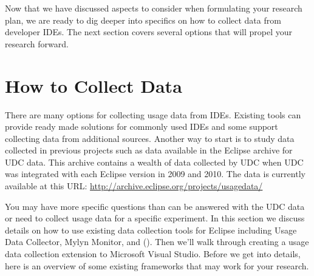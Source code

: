 \vspace{0.1in}
Now that we have discussed aspects to consider when formulating your research plan, we are ready to dig deeper into specifics on how to collect data from developer IDEs.  The next section covers several options that will propel your research forward.

\section{How to Collect Data}
\label{SecHowToCollectData}

There are many options for collecting usage data from IDEs.   Existing tools can provide ready made solutions for commonly used IDEs and some support collecting data from additional sources.   Another way to start is to study data collected in previous projects such as data available in the Eclipse archive for UDC data.  This archive contains a wealth of data collected by UDC when UDC was integrated with each Eclipse version in 2009 and 2010.  The data is currently available at this URL:
\url{http://archive.eclipse.org/projects/usagedata/}

You may have more specific questions than can be answered with the UDC data or need to collect usage data for a specific experiment.  In this section we discuss details on how to use existing data collection tools for Eclipse including Usage Data Collector, Mylyn Monitor, and \CodingSpectator{} ().  Then we'll walk through creating a usage data collection extension to Microsoft Visual Studio.  Before we get into details, here is an overview of some existing frameworks that may work for your research.

